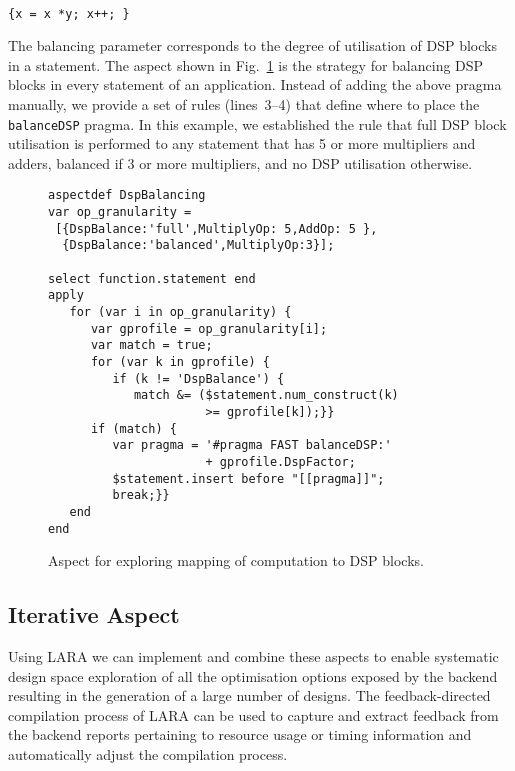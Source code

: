 \noindent\texttt{\footnotesize{} \\
\{x = x *y; x++; \}}

\vspace{2mm} The balancing parameter corresponds to the degree of
utilisation of DSP blocks in a statement.  The aspect shown in
Fig.~\ref{fig:aspect-DSP} is the strategy for balancing DSP blocks in
every statement of an application. Instead of adding the above pragma
manually, we provide a set of rules (lines~3--4) that define where to
place the \texttt{balanceDSP} pragma. In this example, we established the rule
that full DSP block utilisation is performed to any statement that has
5 or more multipliers and adders, balanced if 3 or more multipliers,
and no DSP utilisation otherwise.

\lstset{style=lara}
\begin{figure}[!h]
  \centering
  \begin{lstlisting}
aspectdef DspBalancing
var op_granularity =
 [{DspBalance:'full',MultiplyOp: 5,AddOp: 5 },
  {DspBalance:'balanced',MultiplyOp:3}];

select function.statement end
apply
   for (var i in op_granularity) {
      var gprofile = op_granularity[i];
      var match = true;
      for (var k in gprofile) {
         if (k != 'DspBalance') {
            match &= ($statement.num_construct(k)
                      >= gprofile[k]);}}
      if (match) {
         var pragma = '#pragma FAST balanceDSP:'
                      + gprofile.DspFactor;
         $statement.insert before "[[pragma]]";
         break;}}
   end
end
  \end{lstlisting}
  \caption{Aspect for exploring mapping of computation to DSP blocks.}
  \label{fig:aspect-DSP}
\end{figure}

\subsection{Iterative Aspect}
\label{sect:asp_it}
Using LARA we can implement and combine these aspects to enable
systematic design space exploration of all the optimisation options
exposed by the \MAXC{} backend resulting in the generation of a large
number of designs. The feedback-directed compilation process of LARA
can be used to capture and extract feedback from the backend reports
pertaining to resource usage or timing information and automatically
adjust the compilation process.

